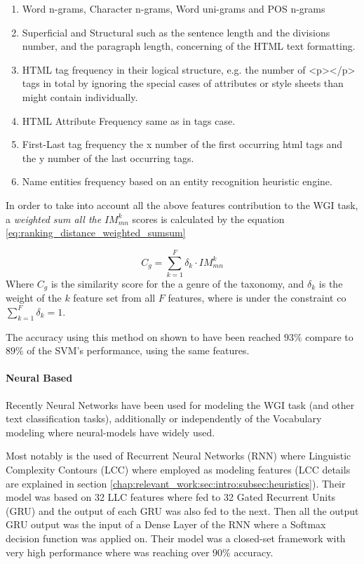 \begin{enumerate}
\item Word n-grams, Character n-grams, Word uni-grams and POS n-grams
\item Superficial and Structural such as the sentence length and the divisions number, and the paragraph length, concerning of the HTML text formatting.
\item HTML tag frequency in their logical structure, e.g. the number of <p></p> tags in total by ignoring the special cases of attributes or style sheets than might contain individually.
\item HTML Attribute Frequency same as in tags case.
\item First-Last tag frequency the x number of  the first occurring html tags and the y number of the last occurring tags.
\item Name entities frequency based on an entity recognition heuristic engine.
\end{enumerate}

In order to take into account all the above features contribution to the WGI task, a \textit{weighted sum all the} $IM^{k}_{mn}$ scores is calculated by the equation \ref{eq:ranking_distance_weighted_sumsum}

\begin{equation}\label{eq:ranking_distance_weighted_sumsum}
	C_{g} = \sum_{k=1}^{F} \delta_{k} \cdot IM_{mn}^{k}
\end{equation}
Where $C_{g}$ is the similarity score for the a genre of the taxonomy, and $\delta_{k}$ is the weight of the $k$ feature set from all $F$ features, where is under the constraint co $\sum_{k=1}^{F} \delta_{k} = 1$.

The accuracy using this method on shown to have been reached $93\%$ compare to $89\%$ of the SVM's performance, using the same features.


\paragraph{Neural Based} Recently Neural Networks have been used for modeling the WGI task (and other text classification tasks), additionally or independently of the Vocabulary modeling where neural-models have widely used. 

Most notably is the used of Recurrent Neural Networks (RNN) where Linguistic Complexity Contours (LCC) where employed as modeling features (LCC details are explained in section \ref{chap:relevant_work:sec:intro:subsec:heuristics}). Their model was based on 32 LLC features where fed to 32 Gated Recurrent Units (GRU)  and the output of each GRU was also fed to the next. Then all the output GRU output was the input of a Dense Layer of the RNN where a Softmax decision function was applied on. Their model was a closed-set framework with very high performance where was reaching over $90\%$  accuracy\parencite{strobel2018text}.

